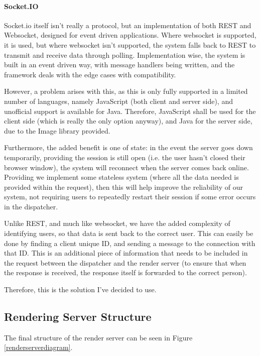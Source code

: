\documentclass[11pt,a4paper]{article}
\begin{document}
\paragraph{Socket.IO}
Socket.io itself isn't really a protocol, but an implementation of both REST and Websocket, designed for event driven
applications. Where websocket is supported, it is used, but where websocket isn't supported, the system falls back to
REST to transmit and receive data through polling. Implementation wise, the system is built in an event driven way,
with message handlers being written, and the framework deals with the edge cases with compatibility. \cite{SocketIOBook}

However, a problem arises with this, as this is only fully supported in a limited number of languages, namely JavaScript (both client
and server side), and unofficial support is available for Java. Therefore, JavaScript shall be used for the client side (which is really the only
option anyway), and Java for the server side, due to the Image library provided. 

Furthermore, the added benefit is one of state: in the event the server goes down temporarily, providing the session is still open (i.e. the user hasn't
closed their browser window), the system will reconnect when the server comes back online. Providing we implement some stateless system (where all the data
needed is provided within the request), then this will help improve the reliability of our system, not requiring users to repeatedly restart their session
if some error occurs in the dispatcher. 

Unlike REST, and much like websocket, we have the added complexity of identifying users, so that data is sent back to the correct user. This can easily be done
by finding a client unique ID, and sending a message to the connection with that ID. This is an additional piece of information that needs to be included in the request
between the dispatcher and the render server (to ensure that when the response is received, the response itself is forwarded to the correct person).

Therefore, this is the solution I've decided to use.

\subsection{Rendering Server Structure}
The final structure of the render server can be seen in Figure \ref{renderserverdiagram}.
\end{document}
